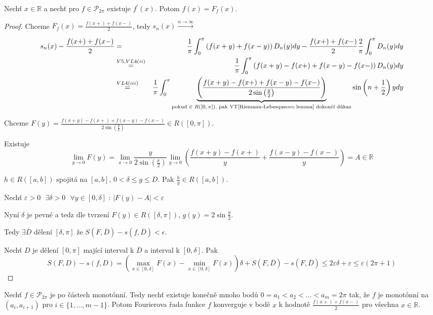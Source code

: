 \begin{dusledek}
Nechť $x \in \mathbb{R}$ a nechť pro $f \in \mathcal{P}_{2 \pi}$ existuje $f^\prime (x)$. Potom $f(x)=F_f(x)$.
\end{dusledek}

\begin{proof}
Chceme $F_f(x) = \frac{f(x+) + f(x-)}{2}$, tedy $s_n(x) \overset{n \rightarrow \infty}{\rightarrow}$

\begin{eqnarray}
s_n(x) - \frac{f(x+)+f(x-)}{2} & = & \frac{1}{\pi} \int_0^\pi \left( f(x+y) + f(x-y) \right) D_n(y) dy - \frac{f(x+) + f(x-)}{2} \frac{2}{\pi} \int_0^\pi D_n(y)dy \nonumber\\
& \overset{V5, VL4 (ii)}{=} & \frac{1}{\pi} \int_0^\pi \left( f(x+y) - f(x+) + f(x-y) - f(x-) \right) D_n(y) dy \nonumber\\
& \overset{VL4(iii)}{=} & \frac{1}{\pi} \int_{0}^\pi \underbrace{\left( \frac{f(x+y) - f(x+) + f(x-y) - f(x-)}{2 \sin \left( \frac{y}{2} \right)} \right)}_{\textrm{pokud $\in R([0,\pi])$, pak VT\ref{Riemann-Lebesqueovo lemma} dokončí důkaz}} \sin \left( n + \frac{1}{2} \right)y dy \nonumber
\end{eqnarray}

Chceme $F(y) = \frac{f(x+y) - f(x+) + f(x-y) - f(x-)}{2 \sin \left( \frac{y}{2} \right)} \in R([0,\pi])$. 

Existuje
$$\lim_{y \rightarrow 0} F(y) = \lim_{x \rightarrow 0} \frac{y}{2 \sin \left( \frac{x}{2} \right)} \lim_{y \rightarrow 0} \left( \frac{f(x+y)-f(x+)}{y} + \frac{f(x-y)-f(x-)}{y} \right) = A \in \mathbb{R}$$

\begin{tvrzeni}
$h \in R([a,b])$ spojitá na $[a,b]$, $0 < \delta \leq g \leq D$. Pak $\frac{h}{g} \in R([a,b])$.
\end{tvrzeni}

Nechť $\varepsilon > 0 \textrm{ } \exists \delta > 0 \textrm{ } \forall y \in [0, \delta] \textrm{ : } |F(y)-A| < \varepsilon$

Nyní $\delta$ je pevné a tedz dle tvrzení $F(y) \in R([\delta, \pi])$, $g(y) = 2 \sin \frac{y}{2}$.

Tedy $\exists \overline{D}$ dělení $[\delta, \pi]$ že $S(F,\overline{D}) - s(f,\overline{D}) < \epsilon$.

Nechť $D$ je dělení $[0,\pi]$ mající interval k $\overline{D}$ a interval k $[0, \delta]$. Pak 
$$S(F, D)-s(f,D) = \left( \max_{x \in [0, \delta]} F(x) - \min_{x \in [0, \delta]} F(x) \right) \delta + S(F, \overline{D}) - s(F, \overline{D}) \leq 2 \varepsilon \delta + \varepsilon \leq \varepsilon (2 \pi + 1)$$
\end{proof}

\begin{vetat}
Nechť $f \in \mathcal{P}_{2\pi}$ je po částech monotónní. Tedy nechť existuje konečně mnoho bodů $0=a_1 < a_2 < \ldots < a_m = 2 \pi$ tak, že $f$ je monotónní na $(a_i, a_{i+1})$ pro $i \in \{1, \ldots, m-1 \}$. Potom Fourierova řada funkce $f$ konverguje v bodě $x$ k hodnotě $\frac{f(x+) + f(x-)}{2}$ pro všechna $x \in \mathbb{R}$.
\end{vetat}